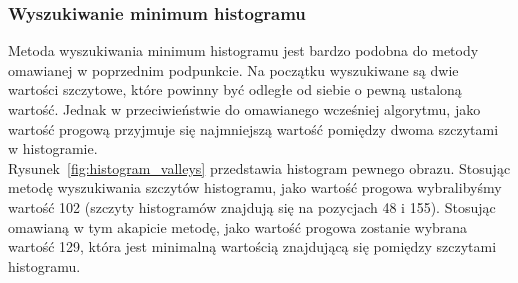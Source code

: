 \subsubsection{Wyszukiwanie minimum histogramu}
Metoda wyszukiwania minimum histogramu jest bardzo podobna do metody omawianej w poprzednim podpunkcie. Na początku wyszukiwane są dwie wartości szczytowe, które powinny być odległe od siebie o pewną ustaloną wartość. Jednak w przeciwieństwie do omawianego wcześniej algorytmu, jako wartość progową przyjmuje się najmniejszą wartość pomiędzy dwoma szczytami w histogramie. \\
Rysunek~\ref{fig:histogram_valleys} przedstawia histogram pewnego obrazu. Stosując metodę wyszukiwania szczytów histogramu, jako wartość progowa wybralibyśmy wartość 102 (szczyty histogramów znajdują się na pozycjach 48 i 155). Stosując omawianą w tym akapicie metodę, jako wartość progowa zostanie wybrana wartość 129, która jest minimalną wartością znajdującą się pomiędzy szczytami histogramu.

